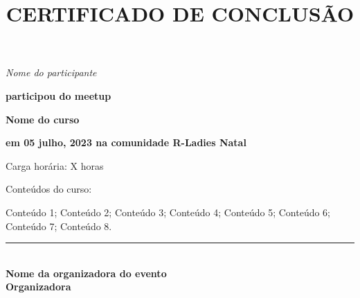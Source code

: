 \documentclass[14pt,landscape]{extarticle}
\title{CERTIFICADO DE CONCLUSÃO}
\author{}
\date{}
\providecommand{\opensans}{\normalfont}
\begin{document}
\opensans

\maketitle

\begin{center}

\LARGE \textit {
Nome do participante
} 

\vspace{1cm}

\normalsize \textbf {
participou do meetup 
}

\vspace{0.5cm}

\large \textbf {
Nome do curso 
}


\large \textbf{
em 05 julho, 2023 na comunidade R-Ladies Natal
}

\vspace{0.5cm}

\large {
Carga horária: X horas

}

\vspace{0.5cm}

\normalsize {
Conteúdos do curso:
}

\vspace{0.5cm}

\normalsize 
\begin{varwidth}{0.8\textwidth}

Conteúdo 1; Conteúdo 2; Conteúdo 3; Conteúdo 4; Conteúdo 5; Conteúdo 6; Conteúdo 7; Conteúdo 8.

\end{varwidth}

\vfill

\vspace{0.5cm}



\rule[0in]{3in}{1pt}\\
\textbf{Nome da organizadora do evento\\
        Organizadora}\\
\vspace{0.5cm}

\end{center}
\end{document}

